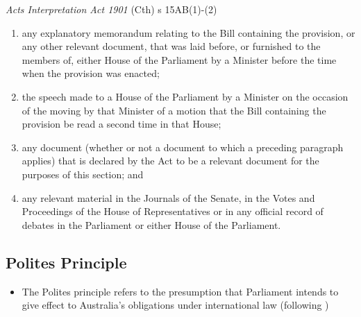 \begin{statutedetails}{\textit{Acts Interpretation Act 1901} (Cth) s 15AB(1)-(2)}
\begin{enumerate}[label=(\arabic*)]
\begin{enumerate}[label=(\alph*)]
            \item any explanatory memorandum relating to the Bill containing the provision, or any other relevant document, that was laid before, or furnished to the members of, either House of the Parliament by a Minister before the time when the provision was enacted;
            \item the speech made to a House of the Parliament by a Minister on the occasion of the moving by that Minister of a motion that the Bill containing the provision be read a second time in that House;
            \item any document (whether or not a document to which a preceding paragraph applies) that is declared by the Act to be a relevant document for the purposes of this section; and
            \item any relevant material in the Journals of the Senate, in the Votes and Proceedings of the House of Representatives or in any official record of debates in the Parliament or either House of the Parliament.
        \end{enumerate}
    \end{enumerate}
\end{statutedetails}

\subsection{Polites Principle}
\begin{itemize}
    \item The Polites principle refers to the presumption that Parliament intends to give effect to Australia's obligations under international law (following )
\end{itemize}

